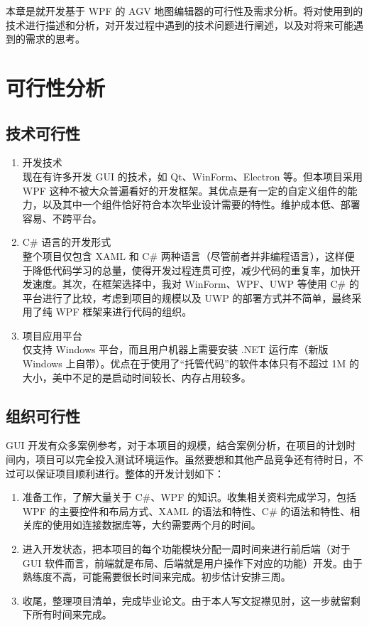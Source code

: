 
本章是就开发基于 WPF 的 AGV 地图编辑器的可行性及需求分析。将对使用到的技术进行描述和分析，对开发过程中遇到的技术问题进行阐述，以及对将来可能遇到的需求的思考。

\section{可行性分析}

\subsection{技术可行性}

\begin{enumerate}
  \item 开发技术\\
        现在有许多开发 GUI 的技术，如 Qt、WinForm、Electron 等。但本项目采用 WPF 这种不被大众普遍看好的开发框架。其优点是有一定的自定义组件的能力，以及其中一个组件恰好符合本次毕业设计需要的特性。维护成本低、部署容易、不跨平台。
  \item C\# 语言的开发形式\\
        整个项目仅包含 XAML 和 C\# 两种语言（尽管前者并非编程语言），这样便于降低代码学习的总量，使得开发过程连贯可控，减少代码的重复率，加快开发速度。其次，在框架选择中，我对 WinForm、WPF、UWP 等使用 C\# 的平台进行了比较，考虑到项目的规模以及 UWP 的部署方式并不简单，最终采用了纯 WPF 框架来进行代码的组织。
  \item 项目应用平台\\
        仅支持 Windows 平台，而且用户机器上需要安装 .NET 运行库（新版 Windows 上自带）。优点在于使用了``托管代码''的软件本体只有不超过 1M 的大小，美中不足的是启动时间较长、内存占用较多。
\end{enumerate}

\subsection{组织可行性}

GUI 开发有众多案例参考，对于本项目的规模，结合案例分析，在项目的计划时间内，项目可以完全投入测试环境运作。虽然要想和其他产品竞争还有待时日，不过可以保证项目顺利进行。整体的开发计划如下：

\begin{enumerate}
  \item 准备工作，了解大量关于 C\#、WPF 的知识。收集相关资料完成学习，包括 WPF 的主要控件和布局方式、XAML 的语法和特性、C\# 的语法和特性、相关库的使用如连接数据库等，大约需要两个月的时间。
  \item 进入开发状态，把本项目的每个功能模块分配一周时间来进行前后端（对于 GUI 软件而言，前端就是布局、后端就是用户操作下对应的功能）开发。由于熟练度不高，可能需要很长时间来完成。初步估计安排三周。
  \item 收尾，整理项目清单，完成毕业论文。由于本人写文捉襟见肘，这一步就留剩下所有时间来完成。
\end{enumerate}

